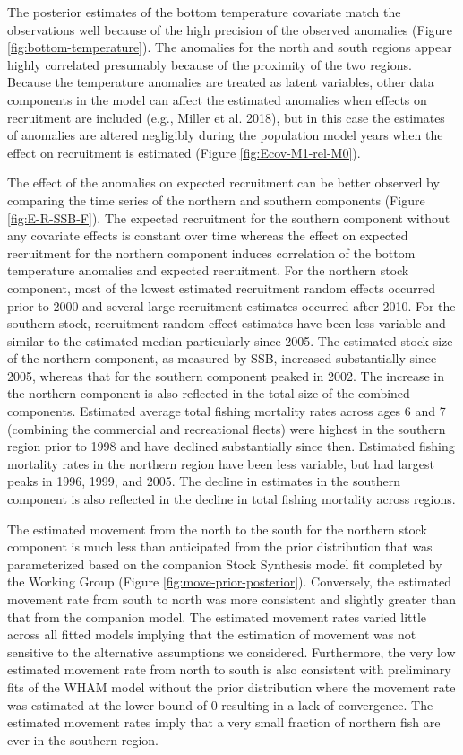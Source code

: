 \documentclass[
]{article}
\begin{document}
The posterior estimates of the bottom temperature covariate match the
observations well because of the high precision of the observed
anomalies (Figure \ref{fig:bottom-temperature}). The anomalies for the
north and south regions appear highly correlated presumably because of
the proximity of the two regions. Because the temperature anomalies are
treated as latent variables, other data components in the model can
affect the estimated anomalies when effects on recruitment are included
(e.g., Miller et al. 2018), but in this case the estimates of anomalies
are altered negligibly during the population model years when the effect
on recruitment is estimated (Figure \ref{fig:Ecov-M1-rel-M0}).

The effect of the anomalies on expected recruitment can be better
observed by comparing the time series of the northern and southern
components (Figure \ref{fig:E-R-SSB-F}). The expected recruitment for
the southern component without any covariate effects is constant over
time whereas the effect on expected recruitment for the northern
component induces correlation of the bottom temperature anomalies and
expected recruitment. For the northern stock component, most of the
lowest estimated recruitment random effects occurred prior to 2000 and
several large recruitment estimates occurred after 2010. For the
southern stock, recruitment random effect estimates have been less
variable and similar to the estimated median particularly since 2005.
The estimated stock size of the northern component, as measured by SSB,
increased substantially since 2005, whereas that for the southern
component peaked in 2002. The increase in the northern component is also
reflected in the total size of the combined components. Estimated
average total fishing mortality rates across ages 6 and 7 (combining the
commercial and recreational fleets) were highest in the southern region
prior to 1998 and have declined substantially since then. Estimated
fishing mortality rates in the northern region have been less variable,
but had largest peaks in 1996, 1999, and 2005. The decline in estimates
in the southern component is also reflected in the decline in total
fishing mortality across regions.

The estimated movement from the north to the south for the northern
stock component is much less than anticipated from the prior
distribution that was parameterized based on the companion Stock
Synthesis model fit completed by the Working Group (Figure
\ref{fig:move-prior-posterior}). Conversely, the estimated movement rate
from south to north was more consistent and slightly greater than that
from the companion model. The estimated movement rates varied little
across all fitted models implying that the estimation of movement was
not sensitive to the alternative assumptions we considered. Furthermore,
the very low estimated movement rate from north to south is also
consistent with preliminary fits of the WHAM model without the prior
distribution where the movement rate was estimated at the lower bound of
0 resulting in a lack of convergence. The estimated movement rates imply
that a very small fraction of northern fish are ever in the southern
region.
\end{document}
